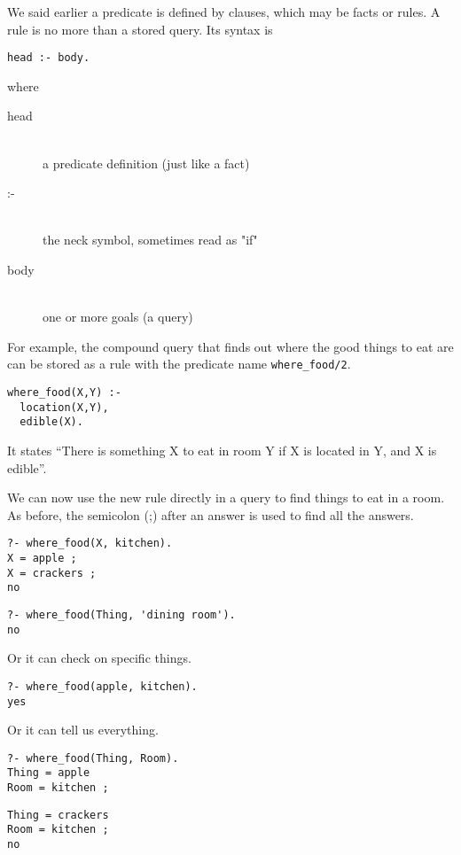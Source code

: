 \label{adv5}\secdown

We said earlier a predicate is defined by clauses, which may be facts or rules. A rule is no more than a stored query. Its syntax is
\begin{verbatim}
head :- body.
\end{verbatim}
where
\begin{description}
\item[head]\ \\
a predicate definition (just like a fact)
\item[:-]\ \\
the neck symbol, sometimes read as "if"
\item[body]\ \\
one or more goals (a query)
\end{description}

For example, the compound query that finds out where the good things to eat are
can be stored as a rule with the predicate name \verb'where_food/2'.
\begin{verbatim}
where_food(X,Y) :-  
  location(X,Y),
  edible(X).
\end{verbatim}
It states ``There is something X to eat in room Y if X is located in Y, and X
is edible''.

We can now use the new rule directly in a query to find things to eat in a room. As before, the semicolon (;) after an answer is used to find all the answers.
\begin{verbatim}
?- where_food(X, kitchen).
X = apple ;
X = crackers ;
no
\end{verbatim}
\begin{verbatim}
?- where_food(Thing, 'dining room').
no
\end{verbatim}
Or it can check on specific things.
\begin{verbatim}
?- where_food(apple, kitchen).
yes
\end{verbatim}
Or it can tell us everything.
\begin{verbatim}
?- where_food(Thing, Room).
Thing = apple
Room = kitchen ;
\end{verbatim}
\begin{verbatim}
Thing = crackers
Room = kitchen ;
no
\end{verbatim}

\secup